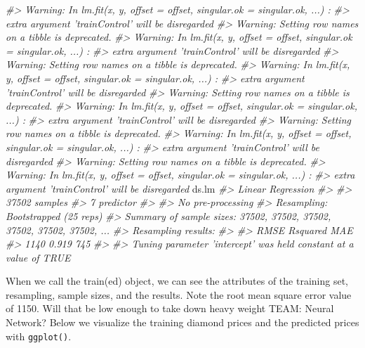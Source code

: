 \documentclass[]{book}
\newenvironment{Shaded}{\begin{snugshade}}{\end{snugshade}}
\newcommand{\CommentTok}[1]{\textcolor[rgb]{0.56,0.35,0.01}{\textit{#1}}}
\newcommand{\NormalTok}[1]{#1}
\begin{document}
\begin{Shaded}
\begin{Highlighting}[]
\CommentTok{#> Warning: In lm.fit(x, y, offset = offset, singular.ok = singular.ok, ...) :}
\CommentTok{#>  extra argument 'trainControl' will be disregarded}
\CommentTok{#> Warning: Setting row names on a tibble is deprecated.}
\CommentTok{#> Warning: In lm.fit(x, y, offset = offset, singular.ok = singular.ok, ...) :}
\CommentTok{#>  extra argument 'trainControl' will be disregarded}
\CommentTok{#> Warning: Setting row names on a tibble is deprecated.}
\CommentTok{#> Warning: In lm.fit(x, y, offset = offset, singular.ok = singular.ok, ...) :}
\CommentTok{#>  extra argument 'trainControl' will be disregarded}
\CommentTok{#> Warning: Setting row names on a tibble is deprecated.}
\CommentTok{#> Warning: In lm.fit(x, y, offset = offset, singular.ok = singular.ok, ...) :}
\CommentTok{#>  extra argument 'trainControl' will be disregarded}
\CommentTok{#> Warning: Setting row names on a tibble is deprecated.}
\CommentTok{#> Warning: In lm.fit(x, y, offset = offset, singular.ok = singular.ok, ...) :}
\CommentTok{#>  extra argument 'trainControl' will be disregarded}
\CommentTok{#> Warning: Setting row names on a tibble is deprecated.}
\CommentTok{#> Warning: In lm.fit(x, y, offset = offset, singular.ok = singular.ok, ...) :}
\CommentTok{#>  extra argument 'trainControl' will be disregarded}
\NormalTok{ds.lm                      }
\CommentTok{#> Linear Regression }
\CommentTok{#> }
\CommentTok{#> 37502 samples}
\CommentTok{#>     7 predictor}
\CommentTok{#> }
\CommentTok{#> No pre-processing}
\CommentTok{#> Resampling: Bootstrapped (25 reps) }
\CommentTok{#> Summary of sample sizes: 37502, 37502, 37502, 37502, 37502, 37502, ... }
\CommentTok{#> Resampling results:}
\CommentTok{#> }
\CommentTok{#>   RMSE  Rsquared  MAE}
\CommentTok{#>   1140  0.919     745}
\CommentTok{#> }
\CommentTok{#> Tuning parameter 'intercept' was held constant at a value of TRUE}
\end{Highlighting}
\end{Shaded}

When we call the train(ed) object, we can see the attributes of the training set, resampling, sample sizes, and the results. Note the root mean square error value of 1150. Will that be low enough to take down heavy weight TEAM: Neural Network? Below we visualize the training diamond prices and the predicted prices with \texttt{ggplot()}.
\end{document}
